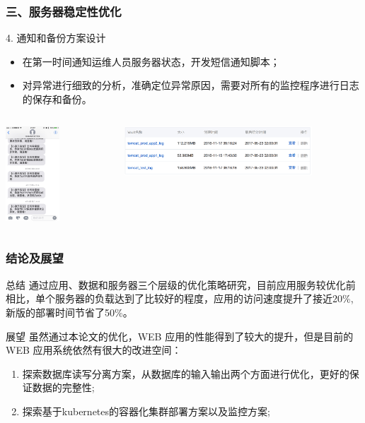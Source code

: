 \documentclass{beamer}
\begin{document}
\begin{frame}
\frametitle{三、服务器稳定性优化}
  \begin{block}{4. 通知和备份方案设计}
    \begin{itemize}
      \item 在第一时间通知运维人员服务器状态，开发短信通知脚本；
      \item 对异常进行细致的分析，准确定位异常原因，需要对所有的监控程序进行日志的保存和备份。
    \end{itemize}
  \end{block}
  \begin{columns}
    \begin{column}{0.30\textwidth}
      \centering
      \includegraphics[width=2cm]{./img/03/message.jpg}
    \end{column}
    \begin{column}{0.70\textwidth}
      \includegraphics[width=7cm]{./img/03/aliyun3.png}
    \end{column}
  \end{columns}
\end{frame}

\begin{frame}
  \frametitle{结论及展望}
  \begin{block}{总结}
    通过应用、数据和服务器三个层级的优化策略研究，目前应用服务较优化前相比，单个服务器的负载达到了比较好的程度，应用的访问速度提升了接近20\%, 新版的部署时间节省了50\%。
  \end{block}
  \begin{block}{展望}
  虽然通过本论文的优化，WEB 应用的性能得到了较大的提升，但是目前的 WEB 应用系统依然有很大的改进空间：
    \begin{enumerate}
      \item 探索数据库读写分离方案，从数据库的输入输出两个方面进行优化，更好的保证数据的完整性;
      \item 探索基于kubernetes的容器化集群部署方案以及监控方案;
    \end{enumerate}
  \end{block}
\end{frame}
\end{document}
